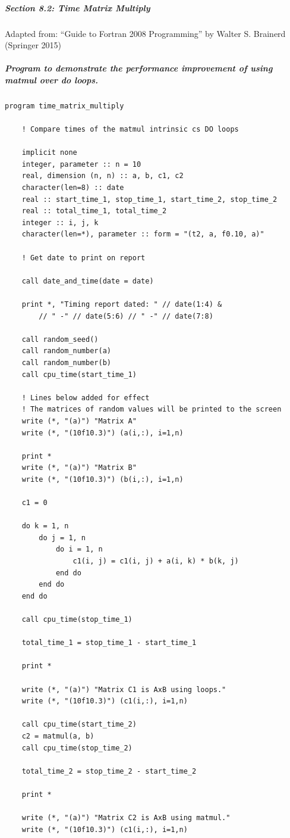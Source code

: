 \subparagraph{Section 8.2: Time Matrix Multiply}

Adapted from: ``Guide to Fortran 2008 Programming'' by Walter S. Brainerd (Springer 2015)

\subparagraph{Program to demonstrate the performance improvement of using matmul over do loops.}

\begin{verbatim}
program time_matrix_multiply

    ! Compare times of the matmul intrinsic cs DO loops

    implicit none
    integer, parameter :: n = 10
    real, dimension (n, n) :: a, b, c1, c2
    character(len=8) :: date
    real :: start_time_1, stop_time_1, start_time_2, stop_time_2
    real :: total_time_1, total_time_2
    integer :: i, j, k
    character(len=*), parameter :: form = "(t2, a, f0.10, a)"

    ! Get date to print on report

    call date_and_time(date = date)

    print *, "Timing report dated: " // date(1:4) &
        // " -" // date(5:6) // " -" // date(7:8)

    call random_seed()
    call random_number(a)
    call random_number(b)
    call cpu_time(start_time_1)
   
    ! Lines below added for effect
    ! The matrices of random values will be printed to the screen
    write (*, "(a)") "Matrix A"
    write (*, "(10f10.3)") (a(i,:), i=1,n)

    print *
    write (*, "(a)") "Matrix B"
    write (*, "(10f10.3)") (b(i,:), i=1,n)

    c1 = 0

    do k = 1, n
        do j = 1, n
            do i = 1, n
                c1(i, j) = c1(i, j) + a(i, k) * b(k, j)
            end do
        end do
    end do

    call cpu_time(stop_time_1)

    total_time_1 = stop_time_1 - start_time_1

    print *

    write (*, "(a)") "Matrix C1 is AxB using loops."
    write (*, "(10f10.3)") (c1(i,:), i=1,n)

    call cpu_time(start_time_2)
    c2 = matmul(a, b)
    call cpu_time(stop_time_2)

    total_time_2 = stop_time_2 - start_time_2

    print *

    write (*, "(a)") "Matrix C2 is AxB using matmul."
    write (*, "(10f10.3)") (c1(i,:), i=1,n)


\end{verbatim}
